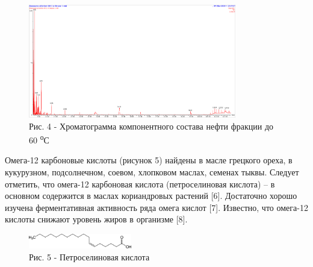 \begin{figure}[H]
	\centering
	\includegraphics[width=0.81\textwidth]{assets/371}
	\caption*{Рис. 4 - Хроматограмма компонентного состава нефти фракции до 60 \textsuperscript{о}С}
\end{figure}

\begin{multicols}{2}
Омега-12 карбоновые кислоты (рисунок 5) найдены в масле грецкого ореха,
в кукурузном, подсолнечном, соевом, хлопковом маслах, семенах тыквы.
Следует отметить, что омега-12 карбоновая кислота (петроселиновая
кислота) -- в основном содержится в маслах кориандровых растений
{[}6{]}. Достаточно хорошо изучена ферментативная активность ряда омега
кислот {[}7{]}. Известно, что омега-12 кислоты снижают уровень жиров в
организме {[}8{]}.
\end{multicols}

\begin{figure}[H]
	\centering
	\includegraphics[width=0.4\textwidth]{assets/372}
	\caption*{Рис. 5 - Петроселиновая кислота}
\end{figure}

